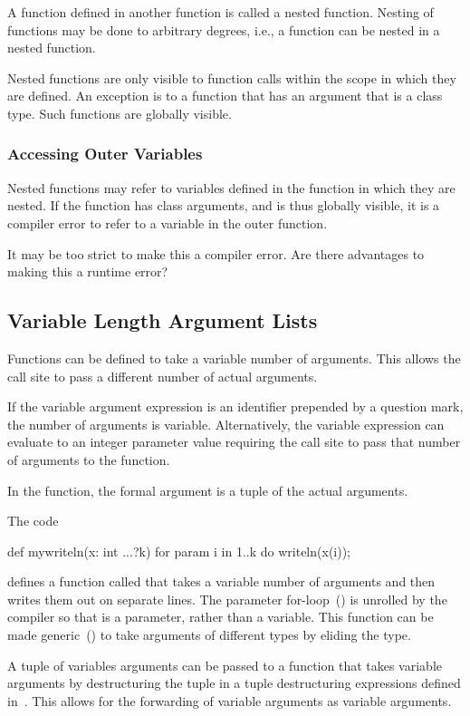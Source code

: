 A function defined in another function is called a nested function.
Nesting of functions may be done to arbitrary degrees, i.e., a
function can be nested in a nested function.

Nested functions are only visible to function calls within the scope
in which they are defined.  An exception is to a function that has an
argument that is a class type.  Such functions are globally visible.

\subsubsection{Accessing Outer Variables}
\label{Accessing_Outer_Variables}

Nested functions may refer to variables defined in the function in
which they are nested.  If the function has class arguments, and is
thus globally visible, it is a compiler error to refer to a variable
in the outer function.

\begin{rationale}
It may be too strict to make this a compiler error.  Are there
advantages to making this a runtime error?
\end{rationale}

\subsection{Variable Length Argument Lists}
\label{Variable_Length_Argument_Lists}

Functions can be defined to take a variable number of arguments.  This
allows the call site to pass a different number of actual arguments.

If the variable argument expression is an identifier prepended by a
question mark, the number of arguments is variable.  Alternatively,
the variable expression can evaluate to an integer parameter value
requiring the call site to pass that number of arguments to the
function.

In the function, the formal argument is a tuple of the actual
arguments.

\begin{example}
The code
\begin{chapel}
def mywriteln(x: int ...?k) {
  for param i in 1..k do
    writeln(x(i));
}
\end{chapel}
defines a function called  that takes a variable
number of arguments and then writes them out on separate lines.  The
parameter for-loop~() is unrolled by the
compiler so that  is a parameter, rather than a variable.
This function can be made generic~() to take arguments
of different types by eliding the type.
\end{example}

A tuple of variables arguments can be passed to a function that takes
variable arguments by destructuring the tuple in a tuple destructuring
expressions defined in~.  This
allows for the forwarding of variable arguments as variable arguments.
